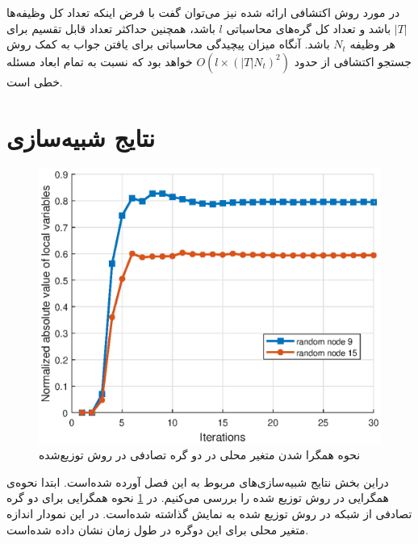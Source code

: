 	در مورد روش اکتشافی ارائه شده نیز می‌توان گفت با فرض اینکه تعداد کل وظیفه‌ها $|T|$ باشد و تعداد کل گره‌های محاسباتی $l$ باشد، همچنین حداکثر تعداد قابل تقسیم برای هر وظیفه $N_t$ باشد. آنگاه میزان پیچیدگی محاسباتی برای یافتن جواب به کمک روش جستجو اکتشافی از حدود $O(l\times(|T|N_t)^2)$ خواهد بود که نسبت به تمام ابعاد مسئله خطی است. 
	
\section{نتایج شبیه‌سازی}

\begin{figure}[h!]
	\centerline{\includegraphics[width=12cm]{graphics/4-heuristic-dist/distributed_local_vars_convergence}}
	\caption{نحوه‌ همگرا شدن متغیر محلی در دو گره تصادفی در روش توزیع‌شده}
	\label{fig:distributed_local_vars_convergence}
\end{figure}

	دراین بخش نتایج شبیه‌سازی‌های مربوط به این فصل آورده شده‌است. ابتدا نحوه‌ی همگرایی در روش توزیع شده را بررسی می‌کنیم. در \cref{fig:distributed_local_vars_convergence} نحوه همگرایی برای دو گره تصادفی از شبکه در روش توزیع شده به نمایش گذاشته شده‌است. در این نمودار اندازه متغیر محلی برای این دوگره در طول زمان نشان داده شده‌است. 
	
